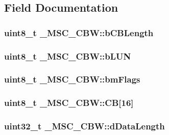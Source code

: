 \subsection{Field Documentation}
\hypertarget{struct__MSC__CBW_a2b867486ab4560cb4a6af62289415400}{
\subsubsection[{b\-C\-B\-Length}]{\setlength{\rightskip}{0pt plus 5cm}uint8\-\_\-t \-\_\-\-M\-S\-C\-\_\-\-C\-B\-W\-::b\-C\-B\-Length}}\label{struct__MSC__CBW_a2b867486ab4560cb4a6af62289415400}
\hypertarget{struct__MSC__CBW_aa6b62e68b9e2b63792ab904e2f090107}{
\subsubsection[{b\-L\-U\-N}]{\setlength{\rightskip}{0pt plus 5cm}uint8\-\_\-t \-\_\-\-M\-S\-C\-\_\-\-C\-B\-W\-::b\-L\-U\-N}}\label{struct__MSC__CBW_aa6b62e68b9e2b63792ab904e2f090107}
\hypertarget{struct__MSC__CBW_a57c100a025722a6f5a30c49035e5a23f}{
\subsubsection[{bm\-Flags}]{\setlength{\rightskip}{0pt plus 5cm}uint8\-\_\-t \-\_\-\-M\-S\-C\-\_\-\-C\-B\-W\-::bm\-Flags}}\label{struct__MSC__CBW_a57c100a025722a6f5a30c49035e5a23f}
\hypertarget{struct__MSC__CBW_a9a89704eaaa2b7079085ecd40a908fe7}{
\subsubsection[{C\-B}]{\setlength{\rightskip}{0pt plus 5cm}uint8\-\_\-t \-\_\-\-M\-S\-C\-\_\-\-C\-B\-W\-::\-C\-B\mbox{[}16\mbox{]}}}\label{struct__MSC__CBW_a9a89704eaaa2b7079085ecd40a908fe7}
\hypertarget{struct__MSC__CBW_af35538f5f1b08d48b3f11f5cb3c858ca}{
\subsubsection[{d\-Data\-Length}]{\setlength{\rightskip}{0pt plus 5cm}uint32\-\_\-t \-\_\-\-M\-S\-C\-\_\-\-C\-B\-W\-::d\-Data\-Length}}\label{struct__MSC__CBW_af35538f5f1b08d48b3f11f5cb3c858ca}
